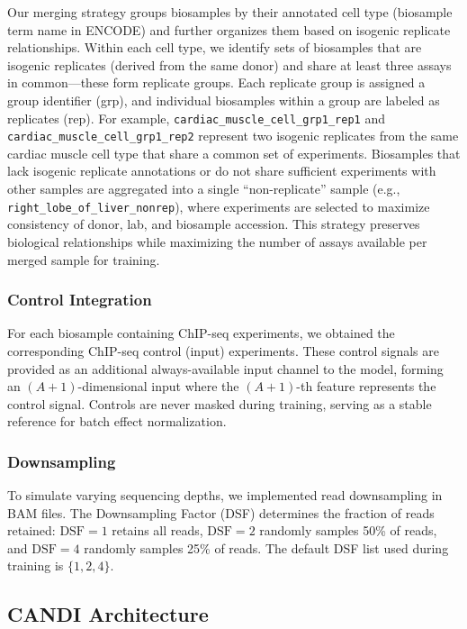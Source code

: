 Our merging strategy groups biosamples by their annotated cell type (biosample term name in ENCODE) and further organizes them based on isogenic replicate relationships. Within each cell type, we identify sets of biosamples that are isogenic replicates (derived from the same donor) and share at least three assays in common---these form replicate groups. Each replicate group is assigned a group identifier (grp), and individual biosamples within a group are labeled as replicates (rep). For example, \texttt{cardiac\_muscle\_cell\_grp1\_rep1} and \texttt{cardiac\_muscle\_cell\_grp1\_rep2} represent two isogenic replicates from the same cardiac muscle cell type that share a common set of experiments. Biosamples that lack isogenic replicate annotations or do not share sufficient experiments with other samples are aggregated into a single ``non-replicate'' sample (e.g., \texttt{right\_lobe\_of\_liver\_nonrep}), where experiments are selected to maximize consistency of donor, lab, and biosample accession. This strategy preserves biological relationships while maximizing the number of assays available per merged sample for training.

\subsubsection{Control Integration}

For each biosample containing ChIP-seq experiments, we obtained the corresponding ChIP-seq control (input) experiments. These control signals are provided as an additional always-available input channel to the model, forming an $(A+1)$-dimensional input where the $(A+1)$-th feature represents the control signal. Controls are never masked during training, serving as a stable reference for batch effect normalization.

\subsubsection{Downsampling}

To simulate varying sequencing depths, we implemented read downsampling in BAM files. The Downsampling Factor (DSF) determines the fraction of reads retained: $\text{DSF} = 1$ retains all reads, $\text{DSF} = 2$ randomly samples 50\% of reads, and $\text{DSF} = 4$ randomly samples 25\% of reads. The default DSF list used during training is $\{1, 2, 4\}$.


\subsection{CANDI Architecture}

